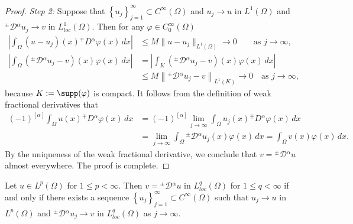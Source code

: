 \documentclass[leqno,final]{siamltex}
\numberwithin{equation}{section}
\renewcommand{\(}{\bigl(}
\renewcommand{\)}{\bigr)}
\begin{document}
\begin{proof}
            \smallskip
            {\em Step 2:}  Suppose that $\left\{u_{j} \right\}_{j=1}^{\infty} \subset C^{\infty}(\Omega)$ and $u_j \rightarrow u$ in $L^{1}(\Omega)$ and ${^{\pm}}{\mathcal{D}}{^{\alpha}} u_{j} \rightarrow v$ in $L^{1}_{loc} ( \Omega)$. Then for any $\varphi \in C^{\infty}_{0}(\Omega)$
            \begin{align*}
                \left|\int_{\Omega} (u -u_j)(x) {^{\mp}}{D}{^{\alpha}} \varphi(x) \,dx \right| &\leq M\|u - u_j \|_{L^{1}(\Omega)}\to 0 \qquad \mbox{as } j\to \infty,\\
                \left|\int_{\Omega} \left({^{\pm}}{\mathcal{D}}{^{\alpha}} u_j - v\right)(x) \varphi(x) \,dx \right| &= \left| \int_{K} \left({^{\pm}}{\mathcal{D}}{^{\alpha}} u_j - v\right)(x) \varphi(x) \,dx \right|\\
                &\leq M \left\|{^{\pm}}{\mathcal{D}}{^{\alpha}} u_j - v \right\|_{L^{1}(K)} \rightarrow 0
                \quad\mbox{as } j\to \infty,
            \end{align*}
            because $K:= \supp(\varphi)$ is compact.  It follows from the definition of weak fractional derivatives that 
            \begin{align*}
                (-1)^{[\alpha]} \int_{\Omega} u(x) {^{\mp}}{D}{^{\alpha}} \varphi (x) \, dx
                &= (-1)^{[\alpha]} \lim_{j \rightarrow \infty} \int_{\Omega} u_j(x) {^{\mp}}{D}{^{\alpha}} \varphi (x) \, dx \\ 
                &= \lim_{j \rightarrow \infty} \int_{\Omega} {^{\pm}}{\mathcal{D}}{^{\alpha}} u_{j}(x) \varphi(x) \, dx 
                = \int_{\Omega} v(x) \varphi(x) \, dx.
            \end{align*}
            By the uniqueness of the weak fractional derivative, we conclude that $v = {^{\pm}}{\mathcal{D}}{^{\alpha}} u$ almost everywhere.  The proof is complete. 
        \end{proof}
        
       \begin{corollary}
            Let $u \in L^{p}(\Omega)$ for $1 \leq p < \infty$. Then $v = {^{\pm}}{\mathcal{D}}{^{\alpha}} u$ in  $L^{q}_{loc} (\Omega)$ for $1\leq q <\infty$ if and only if there exists a sequence $\left\{u_j \right\}_{j=1}^{\infty} \subset C^{\infty} (\Omega)$ such that $u_j \rightarrow u$ in $L^{p}(\Omega)$ and ${^{\pm}}{\mathcal{D}}{^{\alpha}} u_j \rightarrow v$ in $L^{q}_{loc}(\Omega)$ as $j \rightarrow \infty$.
           
        \end{corollary}
      
\end{document}
